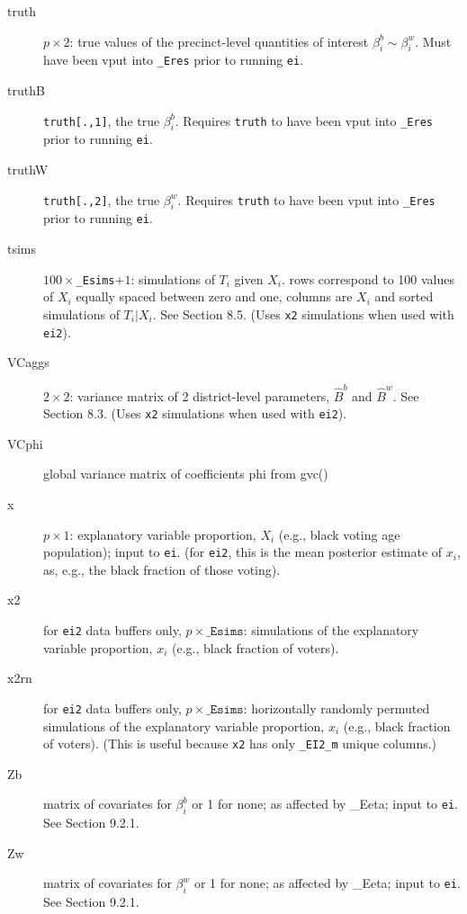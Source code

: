 \documentclass[11pt,titlepage]{article}
\begin{document}
\begin{description}
\item[truth] $p\times 2$: true values of the precinct-level quantities
  of interest $\beta_i^b\sim\beta_i^w$.  Must have been vput into
  \texttt{\_Eres} prior to running \texttt{ei}.

\item[truthB] \texttt{truth[.,1]}, the true $\beta_i^b$.  Requires
  \texttt{truth} to have been vput into \texttt{\_Eres} prior to
  running \texttt{ei}.

\item[truthW] \texttt{truth[.,2]}, the true $\beta_i^w$.  Requires
  \texttt{truth} to have been vput into \texttt{\_Eres} prior to
  running \texttt{ei}.

\item[tsims] $100\times$\texttt{\_Esims}$+1$: simulations of $T_i$
  given $X_i$.  rows correspond to 100 values of $X_i$ equally spaced
  between zero and one, columns are $X_i$ and sorted simulations of
  $T_i|X_i$.  See Section 8.5.  (Uses \texttt{x2} simulations when
  used with \texttt{ei2}).

\item[VCaggs] $2\times 2$: variance matrix of 2 district-level
  parameters, $\hat{B}^b$ and $\hat{B}^w$.  See Section 8.3.  (Uses
  \texttt{x2} simulations when used with \texttt{ei2}).

\item[VCphi] global variance matrix of coefficients phi from gvc()

\item[x] $p\times 1$: explanatory variable proportion, $X_i$ (e.g.,
  black voting age population); input to \texttt{ei}.  (for
  \texttt{ei2}, this is the mean posterior estimate of $x_i$, as,
  e.g., the black fraction of those voting).

\item[x2] for \texttt{ei2} data buffers only,
  $p\times\texttt{\_Esims}$: simulations of the explanatory variable
  proportion, $x_i$ (e.g., black fraction of voters).

\item[x2rn] for \texttt{ei2} data buffers only,
  $p\times\texttt{\_Esims}$: horizontally randomly permuted
  simulations of the explanatory variable proportion, $x_i$ (e.g.,
  black fraction of voters).  (This is useful because \texttt{x2} has
  only \texttt{\_EI2\_m} unique columns.)

\item[Zb] matrix of covariates for $\beta_i^b$ or 1 for none; as
  affected by \_Eeta; input to \texttt{ei}.  See Section 9.2.1.

\item[Zw] matrix of covariates for $\beta_i^w$ or 1 for none; as
  affected by \_Eeta; input to \texttt{ei}.  See Section
  9.2.1.
\end{description}
\end{document}
